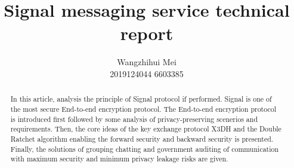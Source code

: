 \documentclass[11pt,en]{elegantpaper}
\title{Signal messaging service technical report}
\author{Wangzhihui Mei \\ 2019124044 6603385}
\institute{CCNU-UOW JI}
\date{}
\begin{document}
\maketitle

\begin{abstract}

    In this article, analysis the principle of Signal protocol if performed. Signal is one of the most secure End-to-end encryption protocol. The End-to-end encryption protocol is introduced first followed by some analysis of privacy-preserving scenerios and requirements. Then, the core ideas of the key exchange protocol X3DH and the Double Ratchet algorithm enabling the forward security and backward security is presented. Finally, the solutions of grouping chatting and government auditing of communication with maximum security and minimum privacy leakage risks are given.


\end{abstract}

\end{document}
